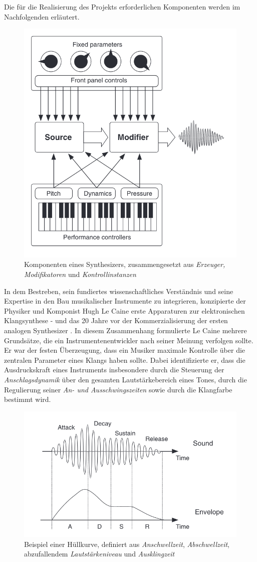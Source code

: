 \documentclass[
  a4paper,  %
  twoside,  %
  bibliography=totoc,
  headsepline,
  cleardoublepage=empty,
  parskip=half,
  draft=false
]{scrbook}
\begin{document}
Die für die Realisierung des Projekts erforderlichen Komponenten werden im Nachfolgenden erläutert.

\begin{figure}[h]
  \centering
  \includegraphics[width=.5\textwidth]{graphics/synthstruc.png}
  \caption[Synth]{Komponenten eines Synthesizers, zusammengesetzt aus \emph{Erzeuger, Modifikatoren} und \emph{Kontrollinstanzen} \cite{russ_sound_2009}}
  \label{fig:synth}
\end{figure}


In dem Bestreben, sein fundiertes wissenschaftliches Verständnis und seine Expertise in den Bau musikalischer Instrumente zu integrieren, konzipierte der Physiker und Komponist Hugh Le Caine erste Apparaturen zur elektronischen Klangsynthese - und das 20 Jahre vor der Kommerzialisierung der ersten analogen Synthesizer \cite{young_gale_hugh_2013}. In diesem Zusammenhang formulierte Le Caine mehrere Grundsätze, die ein Instrumentenentwickler nach seiner Meinung verfolgen sollte. Er war der festen Überzeugung, dass ein Musiker maximale Kontrolle über die zentralen Parameter eines Klangs haben sollte. Dabei identifizierte er, dass die Ausdruckskraft eines Instruments insbesondere durch die Steuerung der \emph{Anschlagsdynamik} über den gesamten Lautstärkebereich eines Tones, durch die Regulierung seiner \emph{An- und Ausschwingszeiten} sowie durch die Klangfarbe bestimmt wird. \cite{ruschkowski_elektronische_2019}

\begin{figure}[h]
  \centering
  \includegraphics[width=.7\textwidth]{graphics/ADSR.png}
  \caption[Hüllkurve]{Beispiel einer Hüllkurve, definiert aus \emph{Anschwellzeit}, \emph{Abschwellzeit}, abzufallendem \emph{Lautstärkeniveau} und \emph{Ausklingzeit} \cite{russ_sound_2009}}
  \label{fig:adsr}
\end{figure}
\end{document}
